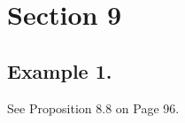 \section{Section 9}

\subsection{Example 1.}

See \cite{kemper2009course} Proposition 8.8 on Page 96.